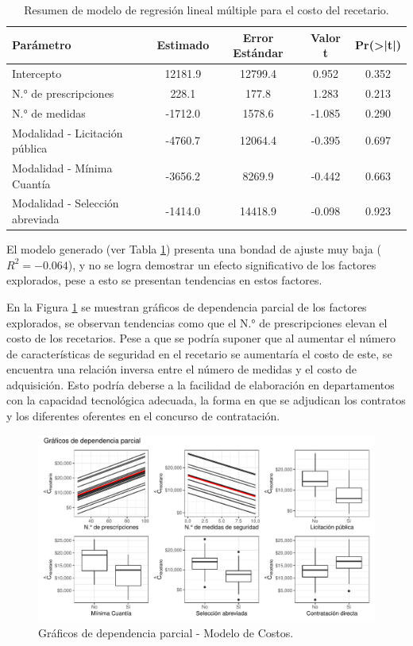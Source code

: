 \documentclass[
]{book}
\begin{document}
\begin{table}

\caption{\label{tab:resumenModeloRegresionLineal}Resumen de modelo de regresión lineal múltiple para el costo del recetario.}
\centering
\begin{tabular}[t]{lcccc}
\toprule
Parámetro & Estimado & Error Estándar & Valor t & Pr(>|t|)\\
\midrule
Intercepto & 12181.9 & 12799.4 & 0.952 & 0.352\\
N.° de prescripciones & 228.1 & 177.8 & 1.283 & 0.213\\
N.° de medidas & -1712.0 & 1578.6 & -1.085 & 0.290\\
Modalidad - Licitación pública & -4760.7 & 12064.4 & -0.395 & 0.697\\
Modalidad - Mínima Cuantía & -3656.2 & 8269.9 & -0.442 & 0.663\\
\addlinespace
Modalidad - Selección abreviada & -1414.0 & 14418.9 & -0.098 & 0.923\\
\bottomrule
\end{tabular}
\end{table}

El modelo generado (ver Tabla \ref{tab:resumenModeloRegresionLineal}) presenta una bondad de ajuste muy baja (\(R^{2} = -0.064\)), y no se logra demostrar un efecto significativo de los factores explorados, pese a esto se presentan tendencias en estos factores.

En la Figura \ref{fig:DependParcial1} se muestran gráficos de dependencia parcial de los factores explorados, se observan tendencias como que el N.° de prescripciones elevan el costo de los recetarios. Pese a que se podría suponer que al aumentar el número de características de seguridad en el recetario se aumentaría el costo de este, se encuentra una relación inversa entre el número de medidas y el costo de adquisición. Esto podría deberse a la facilidad de elaboración en departamentos con la capacidad tecnológica adecuada, la forma en que se adjudican los contratos y los diferentes oferentes en el concurso de contratación.

\begin{figure}

{\centering \includegraphics[width=0.9\linewidth]{InformeFinal_files/figure-latex/DependParcial1-1} 

}

\caption{Gráficos de dependencia parcial - Modelo de Costos.}\label{fig:DependParcial1}
\end{figure}
\end{document}
